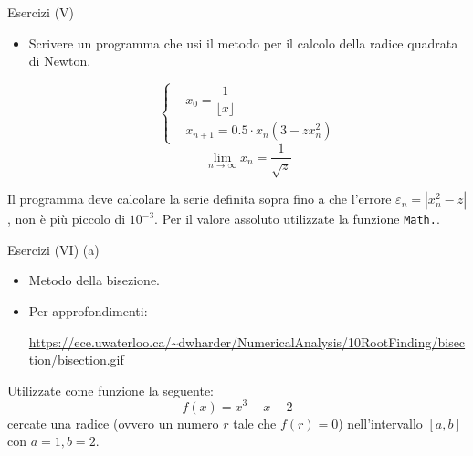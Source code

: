 \begin{frame}{Esercizi (V)}
  \begin{itemize}
    \item Scrivere un programma che usi il metodo per il calcolo della radice quadrata di Newton.
    
    \begin{equation*}
      \left\{\begin{aligned}
	  & x_0 = \dfrac{1}{\lfloor x \rfloor} \\
	  & x_{n +1} = 0.5 \cdot {x_n} (3  - zx^2_n)
      \end{aligned}\right.
    \end{equation*}
    \begin{equation*}
     \lim_{n \to \infty} x_{n} = \dfrac{1}{\sqrt{z}}
    \end{equation*}
  \end{itemize}
  
  Il programma deve calcolare la serie definita sopra fino a che l'errore $\varepsilon_{n} = |x^{2}_{n} - z|$,
  non è più piccolo di $10^{-3}$. Per il valore assoluto utilizzate la funzione \texttt{Math.}.

\end{frame}

\begin{frame}{Esercizi (VI) (a)}
  \begin{itemize}
    \item Metodo della bisezione.
    \item Per approfondimenti:\newline
    \begin{scriptsize}
      \url{https://ece.uwaterloo.ca/~dwharder/NumericalAnalysis/10RootFinding/bisection/bisection.gif}
    \end{scriptsize}
  \end{itemize}

  Utilizzate come funzione la seguente:
  \begin{equation}
    f(x) = x^3 - x - 2
  \end{equation}
  cercate una radice (ovvero un numero $r$ tale che $f(r) = 0$) nell'intervallo $[a, b]$ con $a=1, b=2$.

\end{frame}


